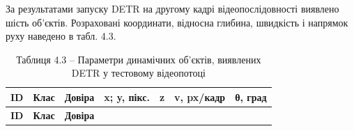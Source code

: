\documentclass[
]{article}
\begin{document}
За результатами запуску DETR на другому кадрі відеопослідовності виявлено шість об'єктів. Розраховані координати, відносна глибина, швидкість і напрямок руху наведено в табл. 4.3.

\begin{longtable}[]{@{}
  >{\raggedright\arraybackslash}p{}
  >{\raggedright\arraybackslash}p{}
  >{\raggedright\arraybackslash}p{}
  >{\raggedright\arraybackslash}p{}
  >{\raggedright\arraybackslash}p{}
  >{\raggedright\arraybackslash}p{}
  >{\raggedright\arraybackslash}p{}@{}}
\caption{Таблиця 4.3 -- Параметри динамічних об'єктів, виявлених DETR у тестовому відеопотоці}\tabularnewline
\toprule\noalign{}
\begin{minipage}[b]{\linewidth}\raggedright
\textbf{ID}
\end{minipage} & \begin{minipage}[b]{\linewidth}\raggedright
\textbf{Клас}
\end{minipage} & \begin{minipage}[b]{\linewidth}\raggedright
\textbf{Довіра}
\end{minipage} & \begin{minipage}[b]{\linewidth}\raggedright
\textbf{x; y, пікс.}
\end{minipage} & \begin{minipage}[b]{\linewidth}\raggedright
\textbf{z}
\end{minipage} & \begin{minipage}[b]{\linewidth}\raggedright
\textbf{v, px/кадр}
\end{minipage} & \begin{minipage}[b]{\linewidth}\raggedright
\textbf{θ, град}
\end{minipage} \\
\midrule\noalign{}
\endfirsthead
\toprule\noalign{}
\begin{minipage}[b]{\linewidth}\raggedright
\textbf{ID}
\end{minipage} & \begin{minipage}[b]{\linewidth}\raggedright
\textbf{Клас}
\end{minipage} & \begin{minipage}[b]{\linewidth}\raggedright
\textbf{Довіра}
\end{minipage} & \begin{minipage}[b]{\linewidth}\raggedright

\end{minipage}
\end{longtable}
\end{document}
